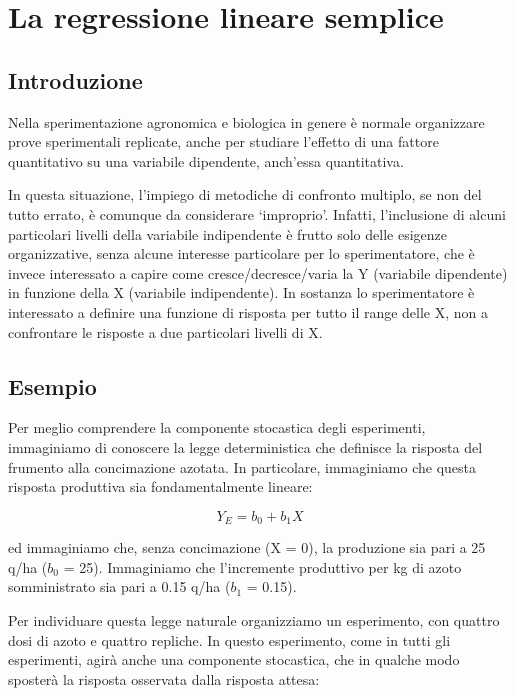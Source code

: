\documentclass[a4paper,12pt,oneside]{book}
\theoremstyle{definition}
\theoremstyle{definition}
\theoremstyle{definition}
\theoremstyle{remark}
\begin{document}
\chapter{La regressione lineare
semplice}\label{la-regressione-lineare-semplice}

\section{Introduzione}\label{introduzione-5}

Nella sperimentazione agronomica e biologica in genere è normale
organizzare prove sperimentali replicate, anche per studiare l'effetto
di una fattore quantitativo su una variabile dipendente, anch'essa
quantitativa.

In questa situazione, l'impiego di metodiche di confronto multiplo, se
non del tutto errato, è comunque da considerare `improprio'. Infatti,
l'inclusione di alcuni particolari livelli della variabile indipendente
è frutto solo delle esigenze organizzative, senza alcune interesse
particolare per lo sperimentatore, che è invece interessato a capire
come cresce/decresce/varia la Y (variabile dipendente) in funzione della
X (variabile indipendente). In sostanza lo sperimentatore è interessato
a definire una funzione di risposta per tutto il range delle X, non a
confrontare le risposte a due particolari livelli di X.

\section{Esempio}\label{esempio-1}

Per meglio comprendere la componente stocastica degli esperimenti,
immaginiamo di conoscere la legge deterministica che definisce la
risposta del frumento alla concimazione azotata. In particolare,
immaginiamo che questa risposta produttiva sia fondamentalmente lineare:

\[Y_E = b_0 + b_1 X\]

ed immaginiamo che, senza concimazione (X = 0), la produzione sia pari a
25 q/ha (\(b_0\) = 25). Immaginiamo che l'incremente produttivo per kg
di azoto somministrato sia pari a 0.15 q/ha (\(b_1\) = 0.15).

Per individuare questa legge naturale organizziamo un esperimento, con
quattro dosi di azoto e quattro repliche. In questo esperimento, come in
tutti gli esperimenti, agirà anche una componente stocastica, che in
qualche modo sposterà la risposta osservata dalla risposta attesa:
\end{document}
